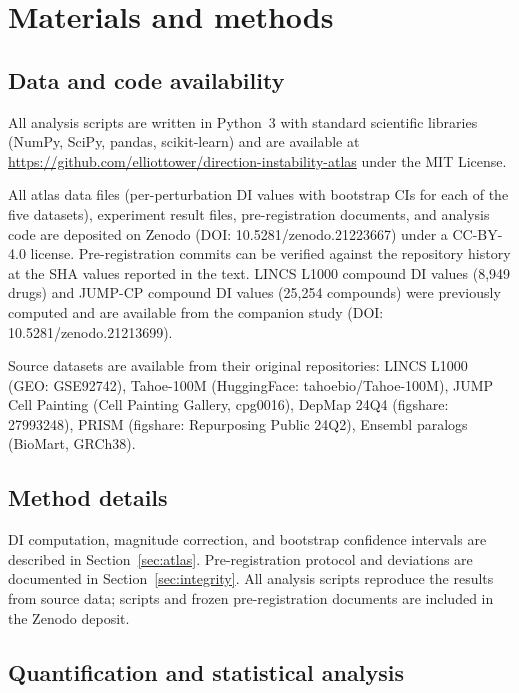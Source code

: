 \documentclass[11pt]{article}
\begin{document}

\section*{Materials and methods}

\subsection*{Data and code availability}
All analysis scripts are written in Python~3 with standard scientific
libraries (NumPy, SciPy, pandas, scikit-learn) and are available at
\url{https://github.com/elliottower/direction-instability-atlas} under
the MIT License.

All atlas data files (per-perturbation DI values with bootstrap CIs for
each of the five datasets), experiment result files, pre-registration
documents, and analysis code are deposited on Zenodo
(DOI: 10.5281/zenodo.21223667) under a CC-BY-4.0 license.
Pre-registration commits can be verified against the repository history
at the SHA values reported in the text.  LINCS L1000 compound DI values
(8{,}949 drugs) and JUMP-CP compound DI values (25{,}254 compounds)
were previously computed and are available from the companion study
(DOI: 10.5281/zenodo.21213699).

Source datasets are available from their original repositories: LINCS
L1000 (GEO: GSE92742), Tahoe-100M (HuggingFace: tahoebio/Tahoe-100M),
JUMP Cell Painting (Cell Painting Gallery, cpg0016), DepMap 24Q4
(figshare: 27993248), PRISM (figshare: Repurposing Public 24Q2),
Ensembl paralogs (BioMart, GRCh38).

\subsection*{Method details}

DI computation, magnitude correction, and bootstrap confidence intervals
are described in Section~\ref{sec:atlas}.  Pre-registration protocol and
deviations are documented in Section~\ref{sec:integrity}.  All analysis
scripts reproduce the results from source data; scripts and frozen
pre-registration documents are included in the Zenodo deposit.

\subsection*{Quantification and statistical analysis}
\end{document}
